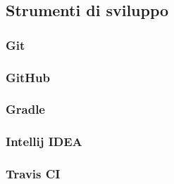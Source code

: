 \subsection{Strumenti di sviluppo}

\subsubsection{Git}

\subsubsection{GitHub}


\subsubsection{Gradle}

\subsubsection{Intellij IDEA}

\subsubsection{Travis CI}
